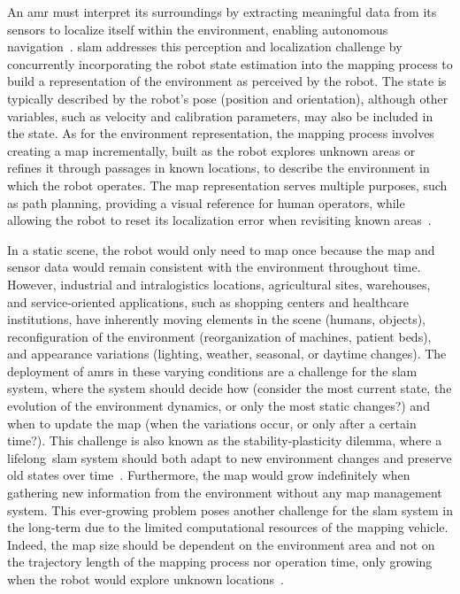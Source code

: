 An \gls{amr} must interpret its surroundings by extracting meaningful data from
its sensors to localize itself within the environment, enabling autonomous
navigation~\cite{siegwart:book:2004}.
\gls{slam} addresses this perception and localization challenge by concurrently
incorporating the robot state estimation into the mapping process to build a
representation of the environment as perceived by the robot.
The state is typically described by the robot's pose (position and orientation),
although other variables, such as velocity and calibration parameters, may also
be included in the state. As for the environment representation, the mapping
process involves creating a map incrementally, built as the robot explores
unknown areas or refines it through passages in known locations, to describe
the environment in which the robot operates. The map representation serves
multiple purposes, such as path planning, providing a visual reference for
human operators, while allowing the robot to reset its localization error when
revisiting known areas~\cite{cadena:tro:2016}.

In a static scene, the robot would only need to map once because the map and
sensor data would remain consistent with the environment throughout time.
However, industrial and intralogistics locations, agricultural sites,
warehouses, and service-oriented applications, such as shopping centers and
healthcare institutions, have inherently moving elements in the scene
(humans, objects), reconfiguration of the environment
(reorganization of machines, patient beds), and appearance variations
(lighting, weather, seasonal, or daytime changes).
The deployment of \glspl{amr} in these varying conditions are a challenge for
the \gls{slam} system, where the system should decide how (consider the most
current state, the evolution of the environment dynamics, or only the most
static changes?) and when to update the map (when the variations occur, or only
after a certain time?). This challenge is also known as the stability-plasticity
dilemma, where a lifelong~\gls{slam} system should both adapt to new environment
changes and preserve old states over time~\cite{biber-duckett:ijrr:2009}.
Furthermore, the map would grow indefinitely when gathering new information from
the environment without any map management system. This ever-growing problem
poses another challenge for the \gls{slam} system in the long-term due to the
limited computational resources of the mapping vehicle. Indeed, the map size
should be dependent on the environment area and not on the trajectory length of
the mapping process nor operation time, only growing when the robot would
explore unknown locations~\cite{kretzschmar-stachniss:ijrr:2012}.

